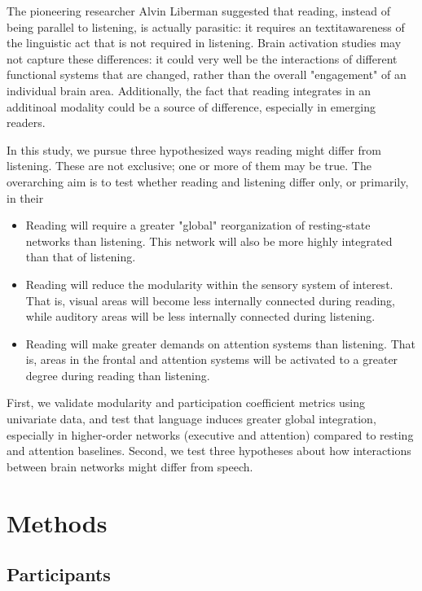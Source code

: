 The pioneering researcher Alvin Liberman suggested that reading, instead of being parallel to listening, is actually parasitic: it requires an textit{awareness} of the linguistic act that is not required in listening. Brain activation studies may not capture these differences: it could very well be the interactions of different functional systems that are changed, rather than the overall "engagement" of an individual brain area. Additionally, the fact that reading integrates in an additinoal modality could be a source of difference, especially in emerging readers. 

In this study, we pursue three hypothesized ways reading might differ from listening. These are not exclusive; one or more of them may be true. The overarching aim is to test whether reading and listening differ only, or primarily, in their 

\begin{itemize}
	\item Reading will require a greater "global" reorganization of resting-state networks than listening. This network will also be more highly integrated than that of listening. 
	\item Reading will reduce the modularity within the sensory system of interest. That is, visual areas will become less internally connected during reading, while auditory areas will be less internally connected during listening.
	\item Reading will make greater demands on attention systems than listening. That is, areas in the frontal and attention systems will be activated to a greater degree during reading than listening.
\end{itemize}

First, we validate modularity and participation coefficient metrics using univariate data, and test that language induces greater global integration, especially in higher-order networks (executive and attention) compared to resting and attention baselines. Second, we test three hypotheses about how interactions between brain networks might differ from speech.


\section{Methods}

\subsection{Participants}


